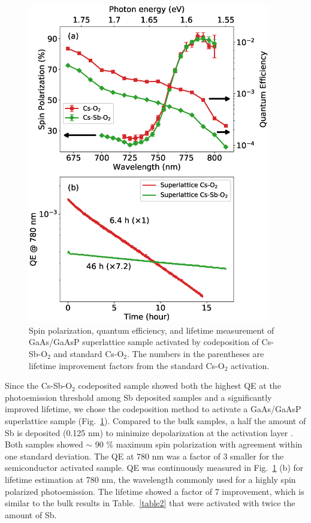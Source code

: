 
\begin{figure}
	\centering
	\includegraphics*[width=300pt]{figs/CsSbO/sl.eps}
	\caption{Spin polarization, quantum efficiency, and lifetime measurement of GaAs/GaAsP superlattice sample activated by codeposition of Cs-Sb-O$_2$ and standard Cs-O$_2$. The numbers in the parentheses are lifetime improvement factors from the standard Cs-O$_2$ activation.}
	\label{fig_superlattice}
	
\end{figure}

Since the Cs-Sb-O$_2$ codeposited sample showed both the highest QE at the photoemission threshold among Sb deposited samples and a significantly improved lifetime, we chose the codeposition method to activate a GaAs/GaAsP superlattice sample \cite{maruyama2004} (Fig.~\ref{fig_superlattice}). Compared to the bulk samples, a half the amount of Sb is deposited (0.125 nm) to minimize depolarization at the activation layer \cite{cultrera2020_LongLifetimePolarized}. Both samples showed $\sim$ 90 \% maximum spin polarization with agreement within one standard deviation. The QE at 780 nm was a factor of 3 smaller for the semiconductor activated sample. QE was continuously measured in Fig.~\ref{fig_superlattice} (b) for lifetime estimation at 780 nm, the wavelength commonly used for a highly spin polarized photoemission.
The lifetime showed a factor of 7 improvement, which is similar to the bulk results in Table.~\ref{table2} that were activated with twice the amount of Sb.



